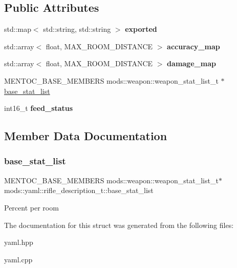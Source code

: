 \subsection*{Public Attributes}
\begin{DoxyCompactItemize}
\item 
\mbox{\label{structmods_1_1yaml_1_1rifle__description__t_ad6991ade7a863ce5cf208f2dcc5e1b72}} 
std\+::map$<$ std\+::string, std\+::string $>$ {\bfseries exported}
\item 
\mbox{\label{structmods_1_1yaml_1_1rifle__description__t_a62e4ea2eefe5171a24463cd0d6c687b5}} 
std\+::array$<$ float, M\+A\+X\+\_\+\+R\+O\+O\+M\+\_\+\+D\+I\+S\+T\+A\+N\+CE $>$ {\bfseries accuracy\+\_\+map}
\item 
\mbox{\label{structmods_1_1yaml_1_1rifle__description__t_a9a406c2cc86c68cd7631f7c5b465fe4c}} 
std\+::array$<$ float, M\+A\+X\+\_\+\+R\+O\+O\+M\+\_\+\+D\+I\+S\+T\+A\+N\+CE $>$ {\bfseries damage\+\_\+map}
\item 
M\+E\+N\+T\+O\+C\+\_\+\+B\+A\+S\+E\+\_\+\+M\+E\+M\+B\+E\+RS mods\+::weapon\+::weapon\+\_\+stat\+\_\+list\+\_\+t $\ast$ \hyperlink{structmods_1_1yaml_1_1rifle__description__t_adaa7f0b69311fc8a11d0de48edec2946}{base\+\_\+stat\+\_\+list}
\item 
\mbox{\label{structmods_1_1yaml_1_1rifle__description__t_a14c1402529111eba70557ce486a36ec5}} 
int16\+\_\+t {\bfseries feed\+\_\+status}
\end{DoxyCompactItemize}


\subsection{Member Data Documentation}
\mbox{\label{structmods_1_1yaml_1_1rifle__description__t_adaa7f0b69311fc8a11d0de48edec2946}} 
\subsubsection{\texorpdfstring{base\+\_\+stat\+\_\+list}{base\_stat\_list}}
{\footnotesize\ttfamily M\+E\+N\+T\+O\+C\+\_\+\+B\+A\+S\+E\+\_\+\+M\+E\+M\+B\+E\+RS mods\+::weapon\+::weapon\+\_\+stat\+\_\+list\+\_\+t$\ast$ mods\+::yaml\+::rifle\+\_\+description\+\_\+t\+::base\+\_\+stat\+\_\+list}

Percent per room 

The documentation for this struct was generated from the following files\+:\begin{DoxyCompactItemize}
\item 
yaml.\+hpp\item 
yaml.\+cpp\end{DoxyCompactItemize}
